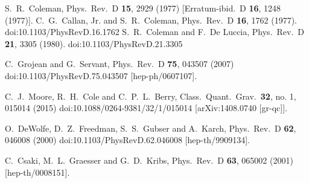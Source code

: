 \documentclass[12pt]{article}
\begin{document}
\begin{thebibliography}{99}
  
  S.~R.~Coleman,
  Phys.\ Rev.\ D {\bf 15}, 2929 (1977)
  [Erratum-ibid.\ D {\bf 16}, 1248 (1977)].
  C.~G.~Callan, Jr. and S.~R.~Coleman,
  Phys.\ Rev.\ D {\bf 16}, 1762 (1977).
  doi:10.1103/PhysRevD.16.1762
  S.~R.~Coleman and F.~De Luccia,
  Phys.\ Rev.\ D {\bf 21}, 3305 (1980).
  doi:10.1103/PhysRevD.21.3305
  
  C.~Grojean and G.~Servant,
  Phys.\ Rev.\ D {\bf 75}, 043507 (2007)
  doi:10.1103/PhysRevD.75.043507
  [hep-ph/0607107].
  
  
  



 


  C.~J.~Moore, R.~H.~Cole and C.~P.~L.~Berry,
  Class.\ Quant.\ Grav.\  {\bf 32}, no. 1, 015014 (2015)
  doi:10.1088/0264-9381/32/1/015014
  [arXiv:1408.0740 [gr-qc]].



  O.~DeWolfe, D.~Z.~Freedman, S.~S.~Gubser and A.~Karch,
  Phys.\ Rev.\ D {\bf 62}, 046008 (2000)
  doi:10.1103/PhysRevD.62.046008
  [hep-th/9909134].
  
  C.~Csaki, M.~L.~Graesser and G.~D.~Kribs,
  Phys.\ Rev.\ D {\bf 63}, 065002 (2001)
  [hep-th/0008151].
 


\end{thebibliography}
\end{document}
